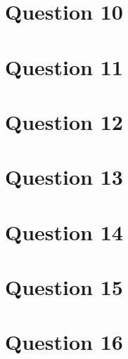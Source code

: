 \documentclass{article}
\begin{document}
\section{Question 10}


\section{Question 11}


\section{Question 12}


\section{Question 13}


\section{Question 14}


\section{Question 15}


\section{Question 16}

\end{document}
